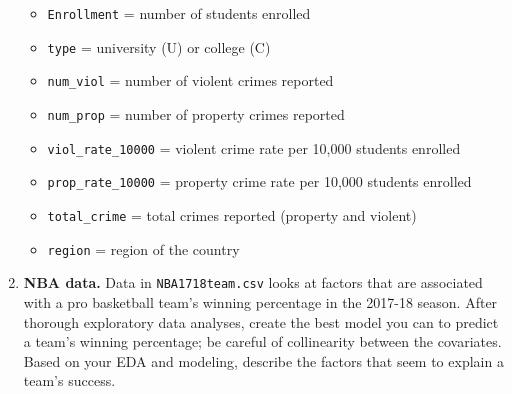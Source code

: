 \documentclass[
]{krantz}
\providecommand{\tightlist}{%
  \setlength{\itemsep}{0pt}\setlength{\parskip}{0pt}}
\begin{document}
\begin{enumerate}
  \begin{itemize}
  \tightlist
  \item
    \texttt{Enrollment} = number of students enrolled
  \item
    \texttt{type} = university (U) or college (C)
  \item
    \texttt{num\_viol} = number of violent crimes reported
  \item
    \texttt{num\_prop} = number of property crimes reported
  \item
    \texttt{viol\_rate\_10000} = violent crime rate per 10,000 students enrolled
  \item
    \texttt{prop\_rate\_10000} = property crime rate per 10,000 students enrolled
  \item
    \texttt{total\_crime} = total crimes reported (property and violent)
  \item
    \texttt{region} = region of the country
  \end{itemize}
\item
  \textbf{NBA data.} Data in \texttt{NBA1718team.csv} \citep{rossotti} looks at factors that are associated with a pro basketball team's winning percentage in the 2017-18 season. After thorough exploratory data analyses, create the best model you can to predict a team's winning percentage; be careful of collinearity between the covariates. Based on your EDA and modeling, describe the factors that seem to explain a team's success.


\end{enumerate}
\end{document}
